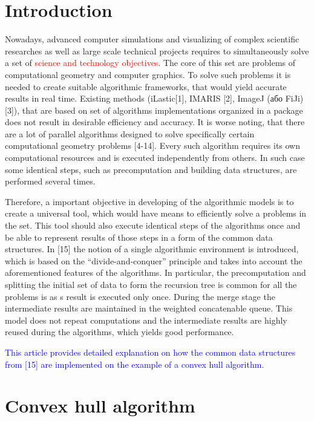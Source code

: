 \documentclass[conference]{IEEEtran}
\theoremstyle{plane}
\begin{document}
\section{Introduction}

Nowadays, advanced computer simulations and visualizing of complex scientific researches as well as large scale technical projects requires to simultaneously solve a set of \textcolor{red}{science and technology objectives}. The core of this set are problems of computational geometry and computer graphics. To solve such problems it is needed to create suitable algorithmic frameworks, that would yield accurate results in real time. Existing methods (iLastic[1], IMARIS [2], ImageJ (або FiJi) [3]), that are based on set of algorithms implementations organized in a package does not result in desirable efficiency and accuracy. It is worse noting, that there are a lot of parallel algorithms designed to solve specifically certain computational geometry problems [4-14]. Every such algorithm requires its own computational resources and is executed independently from others. In such case some identical steps, such as precomputation and building data structures, are performed several times. 

Therefore, a important objective in developing of the algorithmic models is to create a universal tool, which would have means to efficiently solve a problems in the set. This tool should also execute identical steps of the algorithms once and be able to represent results of those steps in a form of the common data structures. In [15] the notion of a single algorithmic environment is introduced, which is based on the ``divide-and-conquer'' principle and takes into account the aforementioned features of the algorithms. In particular, the precomputation and splitting the initial set of data to form the recursion tree is common for all the problems is as s result is executed only once. During the merge stage the intermediate results are maintained in the weighted concatenable queue. This model does not repeat computations and the intermediate results are highly reused during the algorithms, which yields good performance.

\textcolor{blue}{This article provides detailed explanation on how the common data structures from [15] are implemented on the example of a convex hull algorithm.}

\section{Convex hull algorithm}
\end{document}
